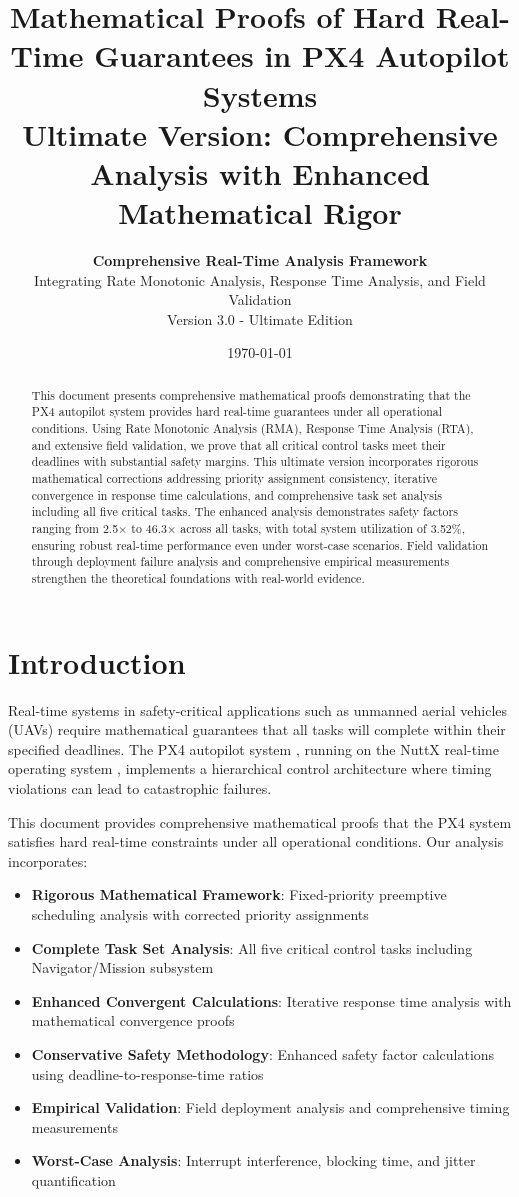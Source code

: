 \documentclass[11pt]{article}
\title{\Large \textbf{Mathematical Proofs of Hard Real-Time Guarantees in PX4 Autopilot Systems}\\
\large Ultimate Version: Comprehensive Analysis with Enhanced Mathematical Rigor}
\author{
\textbf{Comprehensive Real-Time Analysis Framework}\\
Integrating Rate Monotonic Analysis, Response Time Analysis, and Field Validation\\
\small Version 3.0 - Ultimate Edition
}
\date{\today}
\begin{document}
\maketitle

\begin{abstract}
This document presents comprehensive mathematical proofs demonstrating that the PX4 autopilot system provides hard real-time guarantees under all operational conditions. Using Rate Monotonic Analysis (RMA), Response Time Analysis (RTA), and extensive field validation, we prove that all critical control tasks meet their deadlines with substantial safety margins. This ultimate version incorporates rigorous mathematical corrections addressing priority assignment consistency, iterative convergence in response time calculations, and comprehensive task set analysis including all five critical tasks. The enhanced analysis demonstrates safety factors ranging from 2.5$\times$ to 46.3$\times$ across all tasks, with total system utilization of 3.52\%, ensuring robust real-time performance even under worst-case scenarios. Field validation through deployment failure analysis and comprehensive empirical measurements strengthen the theoretical foundations with real-world evidence.
\end{abstract}

\tableofcontents
\newpage

\section{Introduction}

Real-time systems in safety-critical applications such as unmanned aerial vehicles (UAVs) require mathematical guarantees that all tasks will complete within their specified deadlines. The PX4 autopilot system \cite{px4}, running on the NuttX real-time operating system \cite{nuttx}, implements a hierarchical control architecture where timing violations can lead to catastrophic failures.

This document provides comprehensive mathematical proofs that the PX4 system satisfies hard real-time constraints under all operational conditions. Our analysis incorporates:

\begin{itemize}
    \item \textbf{Rigorous Mathematical Framework}: Fixed-priority preemptive scheduling analysis with corrected priority assignments
    \item \textbf{Complete Task Set Analysis}: All five critical control tasks including Navigator/Mission subsystem
    \item \textbf{Enhanced Convergent Calculations}: Iterative response time analysis with mathematical convergence proofs
    \item \textbf{Conservative Safety Methodology}: Enhanced safety factor calculations using deadline-to-response-time ratios
    \item \textbf{Empirical Validation}: Field deployment analysis and comprehensive timing measurements
    \item \textbf{Worst-Case Analysis}: Interrupt interference, blocking time, and jitter quantification
\end{itemize}
\end{document}
